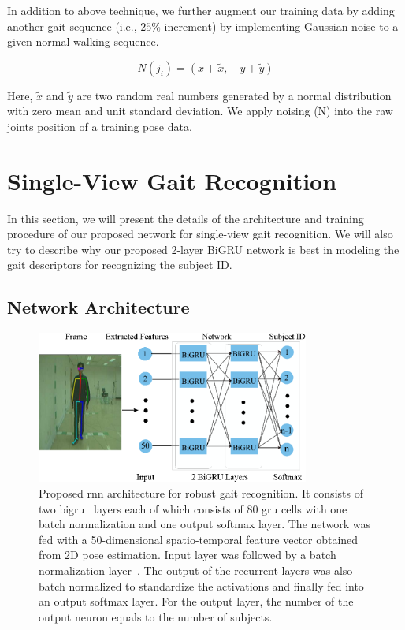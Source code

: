 In addition to above technique, we further augment our training data by adding another gait sequence (i.e., $ 25\% $ increment) by implementing Gaussian noise to a given normal walking sequence. 

\begin{equation}
N(j_i) = (x + \tilde{x},  \quad y+ \tilde{y})
\end{equation}

Here,  $\tilde{x}$ and $\tilde{y}$ are two random real numbers generated by a normal distribution with zero mean and unit standard deviation. We apply noising (N) into the raw joints position of a training pose data.


\section{Single-View Gait Recognition}
In this section, we will present the details of the architecture and training procedure of our proposed network for single-view gait recognition. We will also try to describe why our proposed 2-layer BiGRU network is best in modeling the gait descriptors for recognizing the subject ID.

\subsection{Network Architecture}
\begin{figure}
	\centering 
	\includegraphics[width = 0.8\textwidth]{figures/rnn_network.eps}
	
	\caption[Proposed RNN architecture for robust gait recognition]
	{Proposed \gls{rnn} architecture for robust gait recognition. It consists of two \gls{bigru}~\cite{Schuster_97} layers each of which consists of $ 80 $ \gls{gru} cells with one batch normalization and one output softmax layer. The network was fed with a 50-dimensional spatio-temporal feature vector obtained from 2D pose estimation. Input layer was followed by a batch normalization layer~\cite{Ioffe_15}. The output of the recurrent layers was also batch normalized to standardize the activations and finally fed into an output softmax layer. For the output layer, the number of the output neuron equals to the number of subjects. \label{fig:rnn_network}
    }
\end{figure}


